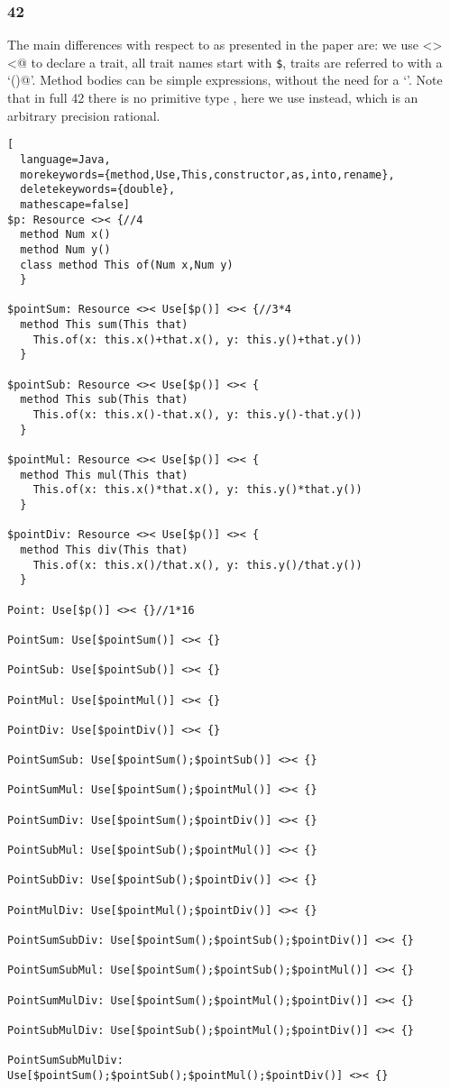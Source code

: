 \subsubsection{42}
The main differences with respect to \name as presented in
the paper are: we use \Q@Resource<><@
to declare a trait, all trait names start with \texttt{\$}, traits are referred to with a `\Q@()@'.
Method bodies can be simple expressions, without the need for a `\Q@return@'.
Note that in full 42 there is no primitive type \Q@int@, here we use \Q@Num@ instead, which is an arbitrary precision rational.
\lstset{language=Java,basicstyle=\tiny\ttfamily}
\begin{lstlisting}[
  language=Java,
  morekeywords={method,Use,This,constructor,as,into,rename},
  deletekeywords={double},
  mathescape=false]
$p: Resource <>< {//4
  method Num x()
  method Num y()
  class method This of(Num x,Num y)
  }

$pointSum: Resource <>< Use[$p()] <>< {//3*4
  method This sum(This that)
    This.of(x: this.x()+that.x(), y: this.y()+that.y())
  }

$pointSub: Resource <>< Use[$p()] <>< {
  method This sub(This that)
    This.of(x: this.x()-that.x(), y: this.y()-that.y())
  }

$pointMul: Resource <>< Use[$p()] <>< {
  method This mul(This that)
    This.of(x: this.x()*that.x(), y: this.y()*that.y())
  }

$pointDiv: Resource <>< Use[$p()] <>< {
  method This div(This that)
    This.of(x: this.x()/that.x(), y: this.y()/that.y())
  }

Point: Use[$p()] <>< {}//1*16

PointSum: Use[$pointSum()] <>< {}

PointSub: Use[$pointSub()] <>< {}

PointMul: Use[$pointMul()] <>< {}

PointDiv: Use[$pointDiv()] <>< {}

PointSumSub: Use[$pointSum();$pointSub()] <>< {}

PointSumMul: Use[$pointSum();$pointMul()] <>< {}

PointSumDiv: Use[$pointSum();$pointDiv()] <>< {}

PointSubMul: Use[$pointSub();$pointMul()] <>< {}

PointSubDiv: Use[$pointSub();$pointDiv()] <>< {}

PointMulDiv: Use[$pointMul();$pointDiv()] <>< {}

PointSumSubDiv: Use[$pointSum();$pointSub();$pointDiv()] <>< {}

PointSumSubMul: Use[$pointSum();$pointSub();$pointMul()] <>< {}

PointSumMulDiv: Use[$pointSum();$pointMul();$pointDiv()] <>< {}

PointSubMulDiv: Use[$pointSub();$pointMul();$pointDiv()] <>< {}

PointSumSubMulDiv: Use[$pointSum();$pointSub();$pointMul();$pointDiv()] <>< {}
\end{lstlisting}


